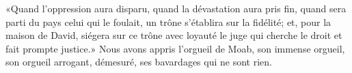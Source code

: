 «Quand l’oppression aura disparu, quand la dévastation aura pris fin,
	quand sera parti du pays celui qui le foulait,
	un trône s’établira sur la fidélité;
	et, pour la maison de David, siégera sur ce trône avec loyauté
	le juge qui cherche le droit et fait prompte justice.»
Nous avons appris l’orgueil de Moab, son immense orgueil, son orgueil arrogant, démesuré,
	ses bavardages qui ne sont rien.
